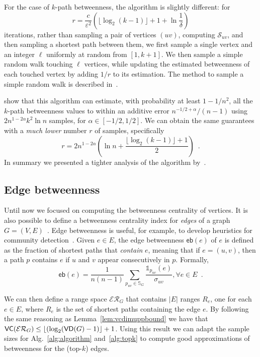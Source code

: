 For the case of $k$-path betweenness, the algorithm is slightly different:
for 
\[
  r= \frac{c}{\varepsilon^2}\left(\lfloor\log_2(k-1)\rfloor + 1 +\ln\frac{1}{\delta}\right)
\]
iterations, rather than sampling a pair of vertices $(uv)$, computing
$\mathcal{S}_{uv}$, and then sampling a shortest path between them, we first sample a
single vertex and an integer $\ell$ uniformly at random from $[1,k+1]$. We then
sample a simple random walk touching $\ell$ vertices, while updating the estimated
betweenness of each touched vertex by adding $1/r$ to its estimation. The method
to sample a simple random walk is described in~\citep{KourtellisASIT12}.

\citet{KourtellisASIT12} show that this algorithm can estimate, with probability
at least $1-1/n^2$, all the $k$-path betweenness values to within an additive
error $n^{-1/2+\alpha}/(n-1)$ using $2n^{1-2\alpha}k^2\ln n$ samples, for
$\alpha\in[-1/2,1/2]$. We can obtain the same guarantees with a \emph{much
lower} number $r$ of samples, specifically
\[
r=2n^{1-2\alpha}\left(\ln n+\frac{\lfloor\log_2(k-1)\rfloor+1}{2}\right)\enspace.
\]
In summary we presented a tighter analysis of the algorithm
by~\citet{KourtellisASIT12}.

\subsection{Edge betweenness}\label{sec:edgebetw}
Until now we focused on computing the betweenness centrality of vertices.
It is also possible to define a betweenness centrality index for \emph{edges} of
a graph $G=(V,E)$~\citep{Anthonisse71,Brandes08}. Edge betweenness is useful,
for example, to develop heuristics for community detection~\citep{NewmanG04}.
Given $e\in E$, the edge betweenness $\mathsf{eb}(e)$ of $e$ is defined as the
fraction of shortest paths that \emph{contain} $e$, meaning that if $e=(u,v)$,
then a path $p$ contains $e$ if $u$ and $v$ appear consecutively in $p$.
Formally,
\[
\mathsf{eb}(e)=\frac{1}{n(n-1)}\sum_{p_{uv}\in\mathbb{S}_G}\frac{\mathds{1}_{p_{uv}}(e)}{\sigma_{uv}}, \forall e\in E\enspace.
\]

We can then define a range space $\mathcal{ER}_G$ that contains $|E|$ ranges $R_e$, one
for each $e\in E$, where $R_e$ is the set of shortest paths containing the edge
$e$. By following the same reasoning as Lemma~\ref{lem:vcdimuppbound} we have that
$\mathsf{VC}(\mathcal{ER}_G)\le\lfloor(\log_2(\mathsf{VD}(G) - 1)\rfloor + 1$. Using this result we can
adapt the sample sizes for Alg.~\ref{alg:algorithm} and~\ref{alg:topk} to
compute good approximations of betweenness for the (top-$k$) edges.

\fi

